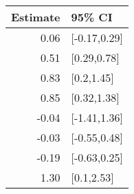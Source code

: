 \begin{tabular}{rl}
  \hline
Estimate & 95\% CI \\ 
  \hline
0.06 & [-0.17,0.29] \\ 
  0.51 & [0.29,0.78] \\ 
  0.83 & [0.2,1.45] \\ 
  0.85 & [0.32,1.38] \\ 
  -0.04 & [-1.41,1.36] \\ 
  -0.03 & [-0.55,0.48] \\ 
  -0.19 & [-0.63,0.25] \\ 
  1.30 & [0.1,2.53] \\ 
   \hline
\end{tabular}

